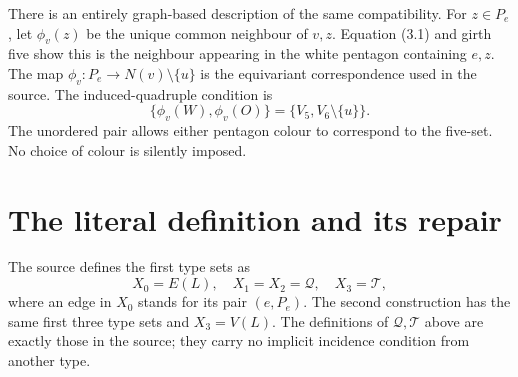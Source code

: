 There is an entirely graph-based description of the same compatibility.
For \(z\in P_e\), let \(\phi_v(z)\) be the unique common neighbour of
\(v,z\). Equation (3.1) and girth five show this is the neighbour
appearing in the white pentagon containing \(e,z\). The map
\(\phi_v:P_e\to N(v)\setminus\{u\}\) is the equivariant correspondence
used in the source. The induced-quadruple condition is \[
 \{\phi_v(W),\phi_v(O)\}
    =\{V_5,V_6\setminus\{u\}\}.
 \tag{3.2}
\] The unordered pair allows either pentagon colour to correspond to the
five-set. No choice of colour is silently imposed.

\section{The literal definition and its
repair}\label{the-literal-definition-and-its-repair}

The source defines the first type sets as \[
 X_0=E(L),\quad X_1=X_2=\mathcal Q,
 \quad X_3=\mathcal T,
\] where an edge in \(X_0\) stands for its pair \((e,P_e)\). The second
construction has the same first three type sets and \(X_3=V(L)\). The
definitions of \(\mathcal Q,\mathcal T\) above are exactly those in the
source; they carry no implicit incidence condition from another type.

